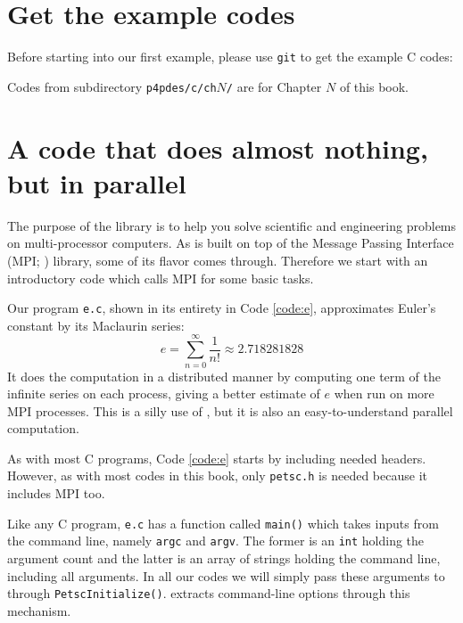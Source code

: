 
\section{Get the example codes}

Before starting into our first example, please use \texttt{git} to get the example C codes:
Codes from subdirectory \texttt{p4pdes/c/ch}$N$\texttt{/} are for Chapter $N$ of this book.

\section{A code that does almost nothing, but in parallel}

The purpose of the \PETSc library is to help you solve scientific and engineering problems on multi-processor computers.  As \PETSc is built on top of the Message Passing Interface (MPI; \citep{Groppetal1999}) library, some of its flavor comes through.  Therefore we start with an introductory \PETSc code which calls MPI for some basic tasks.

Our program \texttt{e.c}, shown in its entirety in Code \ref{code:e}, approximates Euler's constant by its Maclaurin series:
\begin{equation}
e = \sum_{n = 0}^\infty \frac{1}{n!} \approx 2.718281828 \label{eq:gs:introseries}
\end{equation}
It does the computation in a distributed manner by computing one term of the infinite series on each process, giving a better estimate of $e$ when run on more MPI processes. This is a silly use of \PETSc, but it is also an easy-to-understand parallel computation.

As with most C programs, Code \ref{code:e} starts by including needed headers.  However, as with most codes in this book, only \texttt{petsc.h} is needed because it includes MPI too.

Like any C program, \texttt{e.c} has a function called \texttt{main()} which takes inputs from the command line, namely \texttt{argc} and \texttt{argv}.  The former is an \texttt{int} holding the argument count and the latter is an array of strings holding the command line, including all arguments.  In all our codes we will simply pass these arguments to \PETSc through \texttt{PetscInitialize()}.  \PETSc extracts command-line options through this mechanism.

